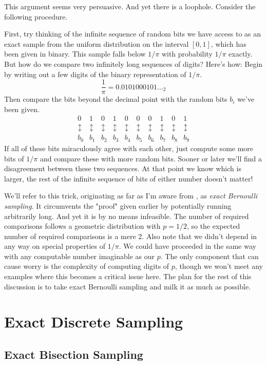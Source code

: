 \documentclass{article}
\begin{document}
This argument seems very persuasive. And yet there is a loophole. Consider the following procedure.

First, try thinking of the infinite sequence of random bits we have access to as an exact sample from the uniform distribution on the interval $[0,1]$, which has been given in binary. This sample falls below $1/\pi$ with probability $1/\pi$ exactly. But how do we compare two infinitely long sequences of digits? Here's how: Begin by writing out a few digits of the binary representation of $1/\pi$.
$$\frac{1}{\pi} = 0.0101000101..._2$$
Then compare the bits beyond the decimal point with the random bits $b_i$ we've been given.
\[
\begin{matrix}
0 & 1 & 0 & 1 & 0 & 0 & 0 & 1 & 0 & 1\\
\updownarrow & \updownarrow & \updownarrow & \updownarrow & \updownarrow & \updownarrow & \updownarrow & \updownarrow & \updownarrow & \updownarrow \\
b_0 & b_1 & b_2 & b_3 & b_4 & b_5 & b_6 & b_7 & b_8 & b_9
\end{matrix}
\]
If all of these bits miraculously agree with each other, just compute some more bits of $1/\pi$ and compare these with more random bits. Sooner or later we'll find a disagreement between these two sequences. At that point we know which is larger, the rest of the infinite sequence of bits of either number doesn't matter!

We'll refer to this trick, originating as far as I'm aware from \cite{Knuth-Yao}, as \textit{exact Bernoulli sampling}. It circumvents the "proof" given earlier by potentially running arbitrarily long. And yet it is by no means infeasible. The number of required comparisons follows a geometric distribution with $p=1/2$, so the expected number of required comparisons is a mere 2. Also note that we didn't depend in any way on special properties of $1/\pi$. We could have proceeded in the same way with any computable number imaginable as our $p$. The only component that can cause worry is the complexity of computing digits of $p$, though we won't meet any examples where this becomes a critical issue here. The plan for the rest of this discussion is to take exact Bernoulli sampling and milk it as much as possible.

\section{Exact Discrete Sampling}

\subsection{Exact Bisection Sampling}
\end{document}
